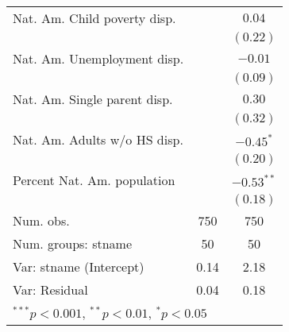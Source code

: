 \begin{table}
\begin{center}
\begin{tabular}{l c c }
Nat. Am. Child poverty disp. &              & $0.04$       \\
                             &              & $(0.22)$     \\
Nat. Am. Unemployment disp.  &              & $-0.01$      \\
                             &              & $(0.09)$     \\
Nat. Am. Single parent disp. &              & $0.30$       \\
                             &              & $(0.32)$     \\
Nat. Am. Adults w/o HS disp. &              & $-0.45^{*}$  \\
                             &              & $(0.20)$     \\
Percent Nat. Am. population  &              & $-0.53^{**}$ \\
                             &              & $(0.18)$     \\
\hline
Num. obs.                    & 750          & 750          \\
Num. groups: stname          & 50           & 50           \\
Var: stname (Intercept)      & 0.14         & 2.18         \\
Var: Residual                & 0.04         & 0.18         \\
\hline
\multicolumn{3}{l}{\scriptsize{$^{***}p<0.001$, $^{**}p<0.01$, $^*p<0.05$}}
\end{tabular}
\label{disp-models}
\end{center}
\end{table}
